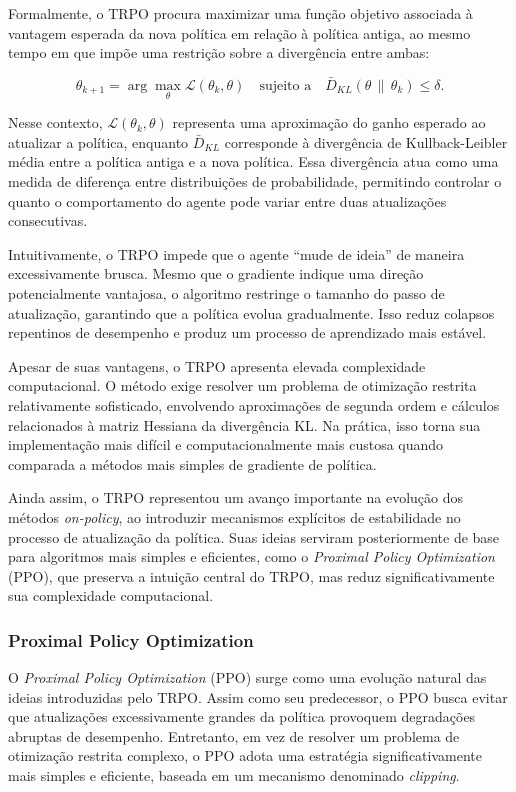 Formalmente, o TRPO procura maximizar uma função objetivo associada à vantagem esperada da nova política em relação à política antiga, ao mesmo tempo em que impõe uma restrição sobre a divergência entre ambas:

$$
\theta_{k+1}
=
\arg\max_{\theta}
\mathcal{L}(\theta_k,\theta)
\quad
\text{sujeito a}
\quad
\bar{D}_{KL}(\theta \,\|\, \theta_k) \leq \delta.
$$

Nesse contexto, $\mathcal{L}(\theta_k,\theta)$ representa uma aproximação do ganho esperado ao atualizar a política, enquanto $\bar{D}_{KL}$ corresponde à divergência de Kullback-Leibler média entre a política antiga e a nova política. Essa divergência atua como uma medida de diferença entre distribuições de probabilidade, permitindo controlar o quanto o comportamento do agente pode variar entre duas atualizações consecutivas.

Intuitivamente, o TRPO impede que o agente ``mude de ideia'' de maneira excessivamente brusca. Mesmo que o gradiente indique uma direção potencialmente vantajosa, o algoritmo restringe o tamanho do passo de atualização, garantindo que a política evolua gradualmente. Isso reduz colapsos repentinos de desempenho e produz um processo de aprendizado mais estável.

Apesar de suas vantagens, o TRPO apresenta elevada complexidade computacional. O método exige resolver um problema de otimização restrita relativamente sofisticado, envolvendo aproximações de segunda ordem e cálculos relacionados à matriz Hessiana da divergência KL. Na prática, isso torna sua implementação mais difícil e computacionalmente mais custosa quando comparada a métodos mais simples de gradiente de política.

Ainda assim, o TRPO representou um avanço importante na evolução dos métodos \textit{on-policy}, ao introduzir mecanismos explícitos de estabilidade no processo de atualização da política. Suas ideias serviram posteriormente de base para algoritmos mais simples e eficientes, como o \textit{Proximal Policy Optimization} (PPO), que preserva a intuição central do TRPO, mas reduz significativamente sua complexidade computacional.

\subsubsection{Proximal Policy Optimization}
\label{subsubsec:ppo}

O \textit{Proximal Policy Optimization} (PPO) \cite{ppo} surge como uma evolução natural das ideias introduzidas pelo TRPO. Assim como seu predecessor, o PPO busca evitar que atualizações excessivamente grandes da política provoquem degradações abruptas de desempenho. Entretanto, em vez de resolver um problema de otimização restrita complexo, o PPO adota uma estratégia significativamente mais simples e eficiente, baseada em um mecanismo denominado \textit{clipping}.

